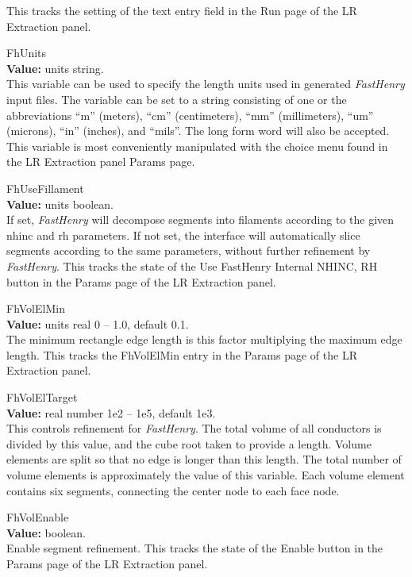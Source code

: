 \begin{description}
This tracks the setting of the text entry field in the {\cb Run} page
of the {\cb LR Extraction} panel.

\item{\et FhUnits}\\
{\bf Value:} units string.\\
This variable can be used to specify the length units used in
generated {\it FastHenry} input files.  The variable can be set to a
string consisting of one or the abbreviations ``{\vt m}'' (meters),
``{\vt cm}'' (centimeters), ``{\vt mm}'' (millimeters), ``{\vt um}''
(microns), ``{\vt in}'' (inches), and ``{\vt mils}''.  The long form
word will also be accepted.  This variable is most conveniently
manipulated with the choice menu found in the {\cb LR Extraction}
panel {\cb Params} page.

\item{\et FhUseFillament}\\
{\bf Value:} units boolean.\\
If set, {\it FastHenry} will decompose segments into filaments
according to the given {\vt nhinc} and {\vt rh} parameters.  If not
set, the interface will automatically slice segments according to the
same parameters, without further refinement by {\it FastHenry\/}. 
This tracks the state of the {\cb Use FastHenry Internal NHINC, RH}
button in the {\cb Params} page of the {\cb LR Extraction} panel.

\item{\et FhVolElMin}\\
{\bf Value:} units real 0 -- 1.0, default 0.1.\\
The minimum rectangle edge length is this factor multiplying
the maximum edge length.  This tracks the {\cb FhVolElMin}
entry in the {\cb Params} page of the {\cb LR Extraction}
panel.

\item{\et FhVolElTarget}\\
{\bf Value:} real number 1e2 -- 1e5, default 1e3.\\
This controls refinement for {\it FastHenry}.  The total volume of all
conductors is divided by this value, and the cube root taken to
provide a length.  Volume elements are split so that no edge is longer
than this length.  The total number of volume elements is
approximately the value of this variable.  Each volume element
contains six segments, connecting the center node to each face node.

\item{\et FhVolEnable}\\
{\bf Value:} boolean.\\
Enable segment refinement.  This tracks the state of the {\cb
Enable} button in the {\cb Params} page of the {\cb LR
Extraction} panel.

\end{description}


